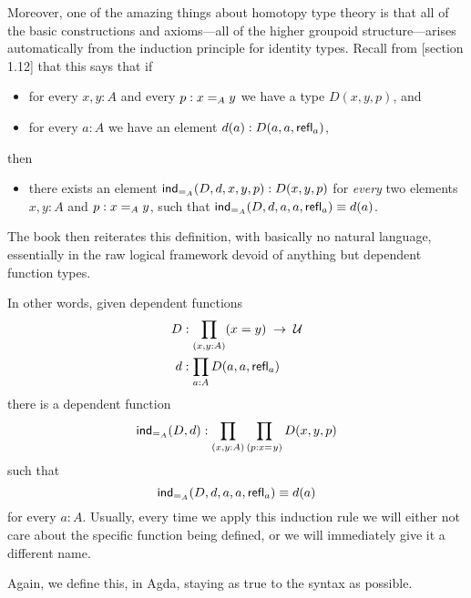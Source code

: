 \begin{definition}[Version 1]

Moreover, one of the amazing things about homotopy type theory is that all of the basic constructions and axioms---all of the
higher groupoid structure---arises automatically from the induction
principle for identity types.
Recall from [section 1.12]  that this says that if %
  \begin{itemize}[noitemsep]
    \item for every $x,y:A$ and every $p:\id[A]xy$ we have a type $D(x,y,p)$, and
    \item for every $a:A$ we have an element $d(a):D(a,a,\refl a)$,
  \end{itemize}
then
  \begin{itemize}[noitemsep]
    \item there exists an element $\indid{A}(D,d,x,y,p):D(x,y,p)$ for \emph{every}
    two elements $x,y:A$ and $p:\id[A]xy$, such that $\indid{A}(D,d,a,a,\refl a)
    \jdeq d(a)$.
  \end{itemize}
\end{definition}
The book then reiterates this definition, with basically no natural language,
essentially in the raw logical framework devoid of anything but dependent
function types.
\begin{definition}[Version 2]
In other words, given dependent functions
\begin{align*}
  D & :\prod_{(x,y:A)}(x= y) \; \to \; \type\\
  d & :\prod_{a:A} D(a,a,\refl{a})
\end{align*}
there is a dependent function
\[\indid{A}(D,d):\prod_{(x,y:A)}\prod_{(p:\id{x}{y})} D(x,y,p)\]
such that
\begin{equation}\label{eq:Jconv}
\indid{A}(D,d,a,a,\refl{a})\jdeq d(a)
\end{equation}
for every $a:A$.
Usually, every time we apply this induction rule we will either not care about the specific function being defined, or we will immediately give it a different name.

\end{definition}
Again, we define this, in Agda, staying as true to the syntax as possible.
